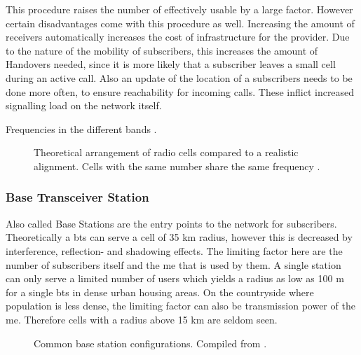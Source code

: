 This procedure raises the number of effectively usable by a large factor.
However certain disadvantages \cite{protocols1999} come with this procedure as well.
Increasing the amount of receivers automatically increases the cost of infrastructure for the provider.
Due to the nature of the mobility of subscribers, this increases the amount of Handovers needed, since it is more likely that a subscriber leaves a small cell during an active call.
Also an update of the location of a subscribers needs to be done more often, to ensure reachability for incoming calls.
These inflict increased signalling load on the network itself.

\begin{table}
\caption{Frequencies in the different bands \cite{kommsys2006}.}
\label{tab:frequencies}
\end{table}

\begin{figure}
\caption{Theoretical arrangement of radio cells compared to a realistic alignment. Cells with the same number share the same frequency \cite{GSM2009}.}
\label{fig:cells}
\end{figure}

\subsubsection{Base Transceiver Station}
Also called Base Stations are the entry points to the network for subscribers.
Theoretically a \gls{bts} can serve a cell of 35 km radius, however this is decreased by interference, reflection- and shadowing effects.
The limiting factor here are the number of subscribers itself and the \gls{me} that is used by them.
A single station can only serve a limited number of users which yields a radius as low as 100 m for a single \gls{bts} \cite{kommsys2006} in dense urban housing areas.
On the countryside where population is less dense, the limiting factor can also be transmission power of the \gls{me}.
Therefore cells with a radius above 15 km are seldom seen.

\begin{figure}
	\caption{Common base station configurations. Compiled from \cite{protocols1999}.}
	\label{fig:configurations}
\end{figure}

